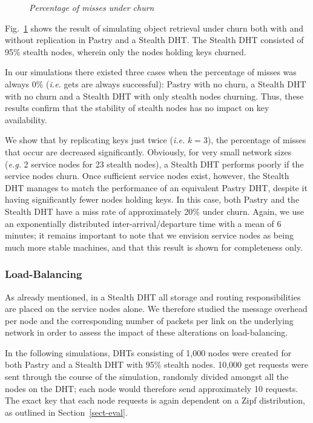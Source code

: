 \documentclass[letterpaper]{sig-alternate} %
\begin{document}
\begin{figure}[tb]
\centering
{}
\caption{\em Percentage of misses under churn} \label{fig:keyavailability}
\end{figure}

Fig.~\ref{fig:keyavailability} shows the result of simulating object retrieval
under churn both with and without replication in Pastry and a Stealth DHT. The
Stealth DHT consisted of 95\% stealth nodes, wherein only the nodes holding
keys churned.

In our simulations there existed three cases when the percentage of
misses was always 0\% (\emph{i.e.} gets are always successful): Pastry
with no churn, a Stealth DHT with no churn and a Stealth DHT with only
stealth nodes churning. Thus, these results confirm that the stability
of stealth nodes has no impact on key availability.

We show that by replicating keys just twice (\emph{i.e.} $k=3$), the percentage
of misses that occur are decreased significantly. Obviously, for very small
network sizes (\emph{e.g.} 2 service nodes for 23 stealth nodes), a Stealth DHT
performs poorly if the service nodes churn. Once sufficient service nodes
exist, however, the Stealth DHT manages to match the performance of an
equivalent Pastry DHT, despite it having significantly fewer nodes holding
keys. In this case, both Pastry and the Stealth DHT have a miss rate of
approximately 20\% under churn. Again, we use an exponentially distributed
inter-arrival/departure time with a mean of 6 minutes; it remains important to
note that we envision service nodes as being much more stable machines, and
that this result is shown for completeness only.

\subsubsection{Load-Balancing}
\label{subsubsect-load}

As already mentioned, in a Stealth DHT all storage and routing
responsibilities are placed on the service nodes alone. We
therefore studied the message overhead per node and the
corresponding number of packets per link on the underlying network
in order to assess the impact of these alterations on
load-balancing.

In the following simulations, DHTs consisting of 1,000 nodes were
created for both Pastry and a Stealth DHT with 95\% stealth nodes.
10,000 get requests were sent through the course of the simulation,
randomly divided amongst all the nodes on the DHT; each node would
therefore send approximately 10 requests. The exact key that each node
requests is again dependent on a Zipf distribution, as outlined in
Section~\ref{sect-eval}.
\end{document}
